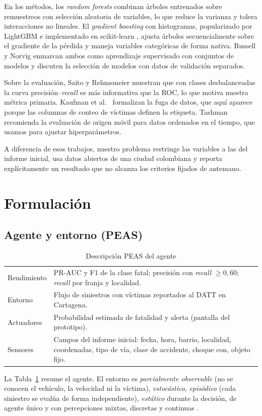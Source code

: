 \documentclass[conference]{IEEEtran}
\begin{document}
En los métodos, los \emph{random forests} \cite{breiman2001rf} combinan árboles entrenados sobre remuestreos con selección aleatoria
de variables, lo que reduce la varianza y tolera interacciones no lineales. El \emph{gradient boosting} con histogramas, popularizado
por LightGBM \cite{ke2017lightgbm} e implementado en scikit-learn \cite{pedregosa2011sklearn}, ajusta árboles secuencialmente sobre
el gradiente de la pérdida y maneja variables categóricas de forma nativa. Russell y Norvig \cite{russell2020aima} enmarcan ambos
como aprendizaje supervisado con conjuntos de modelos y discuten la selección de modelos con datos de validación separados.

Sobre la evaluación, Saito y Rehmsmeier \cite{saito2015pr} muestran que con clases desbalanceadas la curva precisión--\emph{recall}
es más informativa que la ROC, lo que motiva nuestra métrica primaria. Kaufman et al.\ \cite{kaufman2012leakage} formalizan la
fuga de datos, que aquí aparece porque las columnas de conteo de víctimas definen la etiqueta. Tashman \cite{tashman2000outofsample}
recomienda la evaluación de origen móvil para datos ordenados en el tiempo, que usamos para ajustar hiperparámetros.

A diferencia de esos trabajos, nuestro problema restringe las variables a las del informe inicial, usa datos abiertos de una ciudad
colombiana y reporta explícitamente un resultado que no alcanza los criterios fijados de antemano.

\section{Formulación}
\subsection{Agente y entorno (PEAS)}
\begin{table}[t]
\caption{Descripción PEAS del agente}\label{tab:peas}
\centering\small
\begin{tabular}{@{}p{}p{}@{}}
\toprule
Rendimiento & PR-AUC y F1 de la clase fatal; precisión con \emph{recall} $\geq 0{,}60$; \emph{recall} por franja y localidad. \\
Entorno & Flujo de siniestros con víctimas reportados al DATT en Cartagena. \\
Actuadores & Probabilidad estimada de fatalidad y alerta (pantalla del prototipo). \\
Sensores & Campos del informe inicial: fecha, hora, barrio, localidad, coordenadas, tipo de vía, clase de accidente, choque con, objeto fijo. \\
\bottomrule
\end{tabular}
\end{table}
La Tabla~\ref{tab:peas} resume el agente. El entorno es \emph{parcialmente observable} (no se conocen el vehículo, la velocidad
ni la víctima), \emph{estocástico}, \emph{episódico} (cada siniestro se evalúa de forma independiente), \emph{estático} durante la
decisión, de agente único y con percepciones mixtas, discretas y continuas \cite{russell2020aima}.
\end{document}
